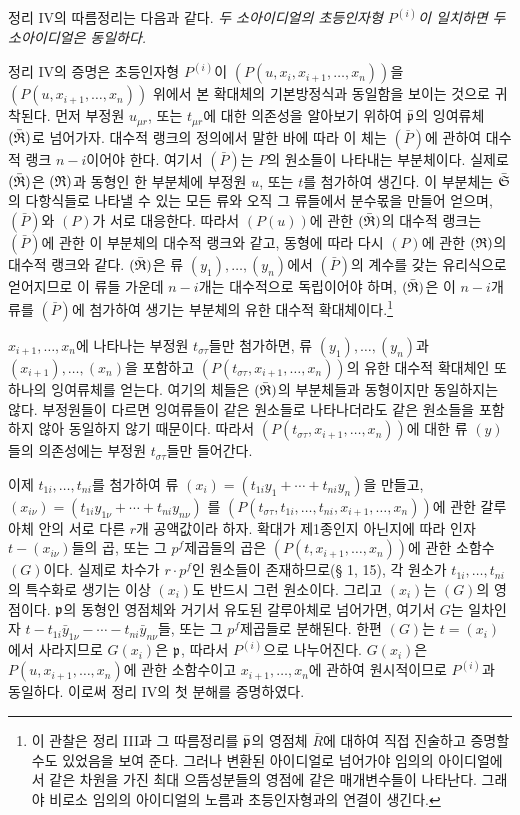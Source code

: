 정리 IV의 따름정리는 다음과 같다. \emph{두 소아이디얼의 초등인자형 \(P^{(i)}\)이 일치하면 두 소아이디얼은 동일하다.}

정리 IV의 증명은 초등인자형 \(P^{(i)}\)이 \((P(u,x_i,x_{i+1},\ldots,x_n))\)을 \((P(u,x_{i+1},\ldots,x_n))\) 위에서 본 확대체의 기본방정식과 동일함을 보이는 것으로 귀착된다. 먼저 부정원 \(u_{\mu r}\), 또는 \(t_{\mu r}\)에 대한 의존성을 알아보기 위하여 \(\bar{\mathfrak p}\)의 잉여류체 \((\bar{\mathfrak{R}})\)로 넘어가자. 대수적 랭크의 정의에서 말한 바에 따라 이 체는 \((\bar P)\)에 관하여 대수적 랭크 \(n-i\)이어야 한다. 여기서 \((\bar P)\)는 \(P\)의 원소들이 나타내는 부분체이다. 실제로 \((\bar{\mathfrak{R}})\)은 \((\mathfrak{R})\)과 동형인 한 부분체에 부정원 \(u\), 또는 \(t\)를 첨가하여 생긴다. 이 부분체는 \(\bar{\mathfrak S}\)의 다항식들로 나타낼 수 있는 모든 류와 오직 그 류들에서 분수몫을 만들어 얻으며, \((\bar P)\)와 \((P)\)가 서로 대응한다. 따라서 \((P(u))\)에 관한 \((\bar{\mathfrak{R}})\)의 대수적 랭크는 \((\bar P)\)에 관한 이 부분체의 대수적 랭크와 같고, 동형에 따라 다시 \((P)\)에 관한 \((\mathfrak{R})\)의 대수적 랭크와 같다. \((\bar{\mathfrak{R}})\)은 류 \((y_1),\ldots,(y_n)\)에서 \((\bar P)\)의 계수를 갖는 유리식으로 얻어지므로 이 류들 가운데 \(n-i\)개는 대수적으로 독립이어야 하며, \((\bar{\mathfrak{R}})\)은 이 \(n-i\)개 류를 \((\bar P)\)에 첨가하여 생기는 부분체의 유한 대수적 확대체이다.\footnote{이 관찰은 정리 III과 그 따름정리를 \(\bar{\mathfrak p}\)의 영점체 \(\bar R\)에 대하여 직접 진술하고 증명할 수도 있었음을 보여 준다. 그러나 변환된 아이디얼로 넘어가야 임의의 아이디얼에서 같은 차원을 가진 최대 으뜸성분들의 영점에 같은 매개변수들이 나타난다. 그래야 비로소 임의의 아이디얼의 노름과 초등인자형과의 연결이 생긴다.}

\(x_{i+1},\ldots,x_n\)에 나타나는 부정원 \(t_{\sigma\tau}\)들만 첨가하면, 류 \((y_1),\ldots,(y_n)\)과 \((x_{i+1}),\ldots,(x_n)\)을 포함하고 \((P(t_{\sigma\tau},x_{i+1},\ldots,x_n))\)의 유한 대수적 확대체인 또 하나의 잉여류체를 얻는다. 여기의 체들은 \((\bar{\mathfrak{R}})\)의 부분체들과 동형이지만 동일하지는 않다. 부정원들이 다르면 잉여류들이 같은 원소들로 나타나더라도 같은 원소들을 포함하지 않아 동일하지 않기 때문이다. 따라서 \((P(t_{\sigma\tau},x_{i+1},\ldots,x_n))\)에 대한 류 \((y)\)들의 의존성에는 부정원 \(t_{\sigma\tau}\)들만 들어간다.

이제 \(t_{1i},\ldots,t_{ni}\)를 첨가하여 류 \((x_i)=(t_{1i}y_1+\cdots+t_{ni}y_n)\)을 만들고,
\(
 (x_{i\nu})=(t_{1i}y_{1\nu}+\cdots+t_{ni}y_{n\nu})
\)
를 \((P(t_{\sigma\tau},t_{1i},\ldots,t_{ni},x_{i+1},\ldots,x_n))\)에 관한 갈루아체 안의 서로 다른 \(r\)개 공액값이라 하자. 확대가 제1종인지 아닌지에 따라 인자 \(t-(x_{i\nu})\)들의 곱, 또는 그 \(p^f\)제곱들의 곱은 \((P(t,x_{i+1},\ldots,x_n))\)에 관한 소함수 \((G)\)이다. 실제로 차수가 \(r\cdot p^f\)인 원소들이 존재하므로(§ 1, 15), 각 원소가 \(t_{1i},\ldots,t_{ni}\)의 특수화로 생기는 이상 \((x_i)\)도 반드시 그런 원소이다. 그리고 \((x_i)\)는 \((G)\)의 영점이다. \(\mathfrak p\)의 동형인 영점체와 거기서 유도된 갈루아체로 넘어가면, 여기서 \(G\)는 일차인자 \(t-t_{1i}\bar y_{1\nu}-\cdots-t_{ni}\bar y_{n\nu}\)들, 또는 그 \(p^f\)제곱들로 분해된다. 한편 \((G)\)는 \(t=(x_i)\)에서 사라지므로 \(G(x_i)\)은 \(\mathfrak p\), 따라서 \(P^{(i)}\)으로 나누어진다. \(G(x_i)\)은 \(P(u,x_{i+1},\ldots,x_n)\)에 관한 소함수이고 \(x_{i+1},\ldots,x_n\)에 관하여 원시적이므로 \(P^{(i)}\)과 동일하다. 이로써 정리 IV의 첫 분해를 증명하였다.

